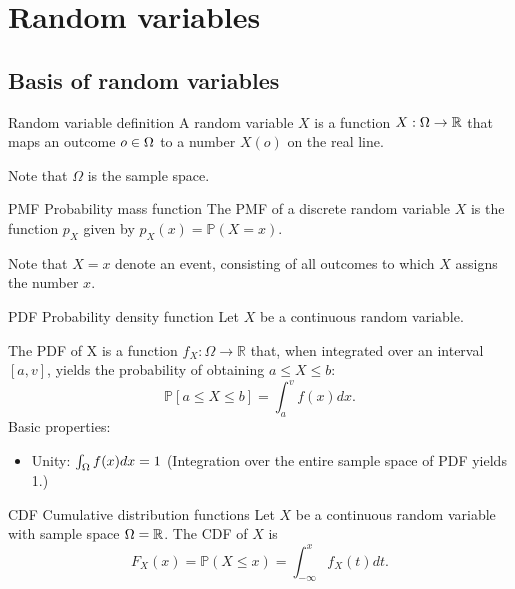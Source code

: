 \section{Random variables}

\subsection{Basis of random variables}

\begin{fact}{Random variable definition}{}
  A random variable $X$ is a function $X:\Omega\rightarrow\mathbb{R}$ that maps an outcome $o\in\Omega$ to a number $X(o)$ on the real line.

  Note that $\Omega$ is the sample space.
\end{fact}

\begin{fact}{PMF \g Probability mass function}{}
    The PMF of a discrete random variable $X$ is the function $p_X$ given by $p_X(x) = \mathbb{P}(X=x)$.

    Note that $X=x$ denote an event, consisting of all outcomes to which $X$ assigns the number $x$.
\end{fact}

\begin{fact}{PDF \g Probability density function}{}
  Let $X$ be a continuous random variable.

  The PDF of X is a function $f_X\mathbin{:}\Omega\rightarrow\mathbb{R}$ that, when integrated
  over an interval $[a,v]$, yields the probability of obtaining $a\le X \le b$:
  \begin{equation*}
    \mathbb{P}[a\le X \le b] = \int_{a}^{v}f(x)dx.
  \end{equation*}
  Basic properties:
  \begin{itemize}
    \item Unity: $\int_\Omega f(x)dx=1$ (Integration over the entire sample space of PDF yields 1.)
  \end{itemize}
\end{fact}

\begin{fact}{CDF \g Cumulative distribution functions}{}
    Let $X$ be a continuous random variable with sample space $\Omega=\mathbb{R}$.
    The CDF of $X$ is
    \begin{equation*}
      F_X(x)=\mathbb{P}(X\le x)=\int_{-\infty}^{x}f_X(t)dt.
    \end{equation*}
\end{fact}

